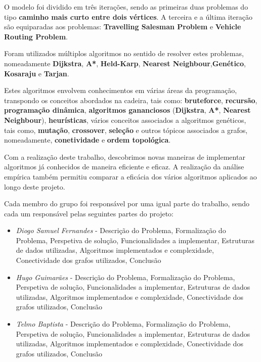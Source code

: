 \documentclass[article, a4paper, 12pt, oneside]{memoir}
\begin{document}
O modelo foi dividido em três iterações, sendo as primeiras duas problemas do tipo \textbf{caminho mais curto entre dois vértices}. A terceira e a última iteração são equiparadas aos problemas: \textbf{Travelling Salesman Problem} e \textbf{Vehicle Routing Problem}.

Foram utilizados múltiplos algoritmos no sentido de resolver estes problemas, nomeadamente \textbf{Dijkstra}, \textbf{A*}, \textbf{Held-Karp}, \textbf{Nearest Neighbour},\textbf{Genético}, \textbf{Kosaraju} e \textbf{Tarjan}.

Estes algoritmos envolvem conhecimentos em várias áreas da programação, transpondo os conceitos abordados na cadeira, tais como: \textbf{bruteforce}, \textbf{recursão}, \textbf{programação dinâmica}, \textbf{algoritmos gananciosos} (\textbf{Dijkstra}, \textbf{A*}, \textbf{Nearest Neighbour}), \textbf{heurísticas}, vários conceitos associados a algoritmos genéticos, tais como, \textbf{mutação}, \textbf{crossover}, \textbf{seleção} e outros tópicos associados a grafos, nomeadamente, \textbf{conetividade} e  \textbf{ordem topológica}.

Com a realização deste trabalho, descobrimos novas maneiras de implementar algoritmos já conhecidos de maneira eficiente e eficaz. A realização da análise empírica também permitiu comparar a eficácia dos vários algoritmos aplicados ao longo deste projeto.

Cada membro do grupo foi responsável por uma igual parte do trabalho, sendo cada um responsável pelas seguintes partes do projeto:
\begin{itemize}
	\item\emph{ Diogo Samuel Fernandes} - Descrição do Problema, Formalização do Problema, Perspetiva de solução, Funcionalidades a implementar, Estruturas de dados utilizadas, Algoritmos implementados e complexidade, Conectividade dos grafos utilizados, Conclusão
	\item\emph{ Hugo Guimarães} - Descrição do Problema, Formalização do Problema, Perspetiva de solução, Funcionalidades a implementar, Estruturas de dados utilizadas, Algoritmos implementados e complexidade, Conectividade dos grafos utilizados, Conclusão
	\item\emph{ Telmo Baptista} - Descrição do Problema, Formalização do Problema, Perspetiva de solução, Funcionalidades a implementar, Estruturas de dados utilizadas, Algoritmos implementados e complexidade, Conectividade dos grafos utilizados, Conclusão
\end{itemize}
\end{document}

